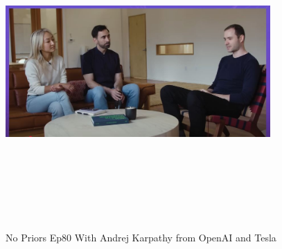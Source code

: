 \documentclass[a4paper,12pt]{article}
\begin{document}
\newpage
\vspace*{1cm} %
\begin{figure}[h]
	\centering
	\vspace{-10pt} %
	\includegraphics[width=0.9\textwidth, height=12cm, keepaspectratio]{../Talks Blogs/No Priors Ep80 With Andrej Karpathy from OpenAI and Tesla}
	\vspace{-5pt} %
	\caption{No Priors Ep80  With Andrej Karpathy from OpenAI and Tesla}
	\vspace{-10pt}
\end{figure}
\end{document}
